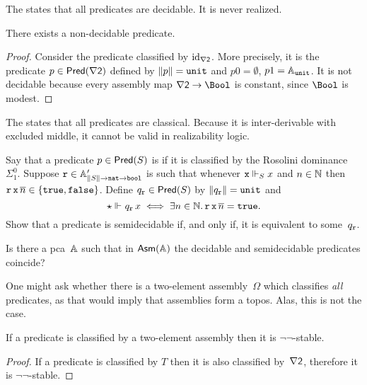 The  states that all predicates are decidable. It is never realized.

\begin{proposition}
  There exists a non-decidable predicate.
\end{proposition}

\begin{proof}
  Consider the predicate classified by $\id[\nabla \two]$.
  More precisely, it is the predicate $p \in \Pred{\nabla \two}$ defined by
  $\T{p} = \unit$ and $p 0 = \emptyset$, $p 1 = \Atyp{\unit}$.
  It is not decidable because every assembly map $\nabla \two \to \Bool$ is constant, since $\Bool$ is modest.
\end{proof}

The  states that all predicates are classical. Because it is inter-derivable with excluded middle, it cannot be valid in realizability logic.

\begin{exercise}
  Say that a predicate $p \in \Pred{S}$ is  if it is classified by the Rosolini dominance $\Sigma^0_1$. 
  Suppose $\R{r} \in \subAtyp{\T{S} \to \ttnat \to \ttbool}$ is such that
  whenever $\R{x} \rz[S] x$ and $n \in \NN$ then $\R{r}\,\R{x}\,\overline{n} \in \set{\combTrue, \combFalse}$. Define $q_{\R{r}} \in \Pred{S}$ by $\T{q_{\R{r}}} = \unit$ and
  \begin{equation*}
    \ttunit \rz q_{\R{r}}\,x
    \iff \some{n \in \NN} \R{r}\,\R{x}\,\overline{n} = \combTrue.
  \end{equation*}
  Show that a predicate is semidecidable if, and only if, it is equivalent to some~$q_{\R{r}}$.
\end{exercise}

\begin{exercise}
  Is there a pca~$\AA$ such that in $\Asm{\AA}$ the decidable and semidecidable predicates coincide?
\end{exercise}

One might ask whether there is a two-element assembly~$\Omega$ which classifies \emph{all} predicates, as that would imply that assemblies form a topos. Alas, this is not the case.

\begin{proposition}
  If a predicate is classified by a two-element assembly then it is $\lnot\lnot$-stable.
\end{proposition}

\begin{proof}
  If a predicate is classified by $T$ then it is also classified by~$\nabla \two$, therefore it is $\lnot\lnot$-stable.
\end{proof}

